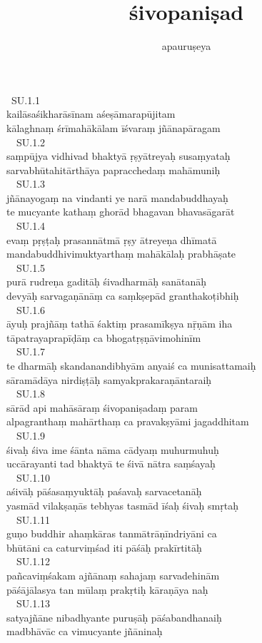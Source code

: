 \documentclass{tufte-handout}
\title{śivopaniṣad}
\author{apauruṣeya}
\begin{document}
\maketitle

 \ SU.1.1\\kailāsaśikharāsīnam aśeṣāmarapūjitam\\kālaghnaṃ śrīmahākālam īśvaraṃ jñānapāragam\\\  \ SU.1.2\\saṃpūjya vidhivad bhaktyā ṛṣyātreyaḥ susaṃyataḥ\\sarvabhūtahitārthāya papracchedaṃ mahāmuniḥ\\\  \ SU.1.3\\jñānayogaṃ na vindanti ye narā mandabuddhayaḥ\\te mucyante kathaṃ ghorād bhagavan bhavasāgarāt\\\  \ SU.1.4\\evaṃ pṛṣṭaḥ prasannātmā ṛṣy ātreyeṇa dhīmatā\\mandabuddhivimuktyarthaṃ mahākālaḥ prabhāṣate\\\  \ SU.1.5\\purā rudreṇa gaditāḥ śivadharmāḥ sanātanāḥ\\devyāḥ sarvagaṇānāṃ ca saṃkṣepād granthakoṭibhiḥ\\\  \ SU.1.6\\āyuḥ prajñāṃ tathā śaktiṃ prasamīkṣya nṝṇām iha\\tāpatrayaprapīḍāṃ ca bhogatṛṣṇāvimohinīm\\\  \ SU.1.7\\te dharmāḥ skandanandibhyām anyaiś ca munisattamaiḥ\\sāramādāya nirdiṣṭāḥ samyakprakaraṇāntaraiḥ\\\  \ SU.1.8\\sārād api mahāsāraṃ śivopaniṣadaṃ param\\alpagranthaṃ mahārthaṃ ca pravakṣyāmi jagaddhitam\\\  \ SU.1.9\\śivaḥ śiva ime śānta nāma cādyaṃ muhurmuhuḥ\\uccārayanti tad bhaktyā te śivā nātra saṃśayaḥ\\\  \ SU.1.10\\aśivāḥ pāśasaṃyuktāḥ paśavaḥ sarvacetanāḥ\\yasmād vilakṣaṇās tebhyas tasmād īśaḥ śivaḥ smṛtaḥ\\\  \ SU.1.11\\guṇo buddhir ahaṃkāras tanmātrāṇīndriyāni ca\\bhūtāni ca caturviṃśad iti pāśāḥ prakīrtitāḥ\\\  \ SU.1.12\\pañcaviṃśakam ajñānaṃ sahajaṃ sarvadehinām\\pāśājālasya tan mūlaṃ prakṛtiḥ kāraṇāya naḥ\\\  \ SU.1.13\\satyajñāne nibadhyante puruṣāḥ pāśabandhanaiḥ\\madbhāvāc ca vimucyante jñāninaḥ 
\end{document}
